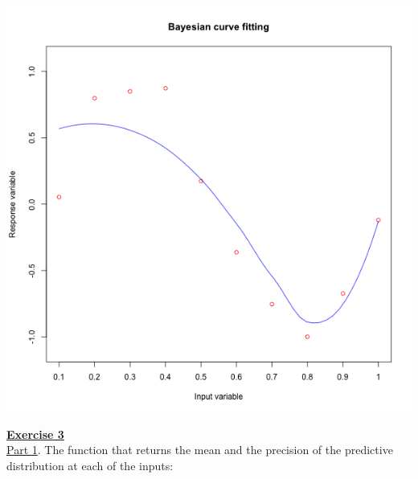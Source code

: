 \documentclass[a4paper, 11pt]{article}\usepackage[]{graphicx}\usepackage[]{color}
\begin{document}
\begin{center}
\includegraphics[scale = 0.5]{ps2_plot2.png}
\end{center}
\newpage
\textbf{\underline{Exercise 3}}\\
\newline \underline{Part 1}. The function that returns the mean and the precision of the predictive distribution at each of the inputs:
\end{document}
